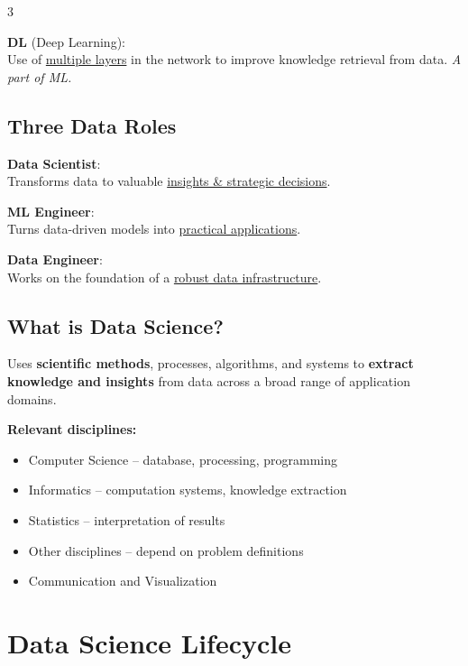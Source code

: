 \documentclass[a4paper,7pt]{extarticle}
\begin{document}
\begin{multicols}{3}
\begin{infobox}
\textbf{DL} (Deep Learning):\\
Use of \underline{multiple layers} in the network to improve knowledge retrieval from data. \textit{A part of ML.}
\end{infobox}

\subsection{Three Data Roles}

\begin{defbox}
\textbf{Data Scientist}:\\
Transforms data to valuable \underline{insights \& strategic decisions}.

\textbf{ML Engineer}:\\
Turns data-driven models into \underline{practical applications}.

\textbf{Data Engineer}:\\
Works on the foundation of a \underline{robust data infrastructure}.
\end{defbox}

\subsection{What is Data Science?}

\begin{infobox}
Uses \textbf{scientific methods}, processes, algorithms, and systems to \textbf{extract knowledge and insights} from data across a broad range of application domains.

\smallskip
\textbf{Relevant disciplines:}
\begin{itemize}
  \item Computer Science -- database, processing, programming
  \item Informatics -- computation systems, knowledge extraction
  \item Statistics -- interpretation of results
  \item Other disciplines -- depend on problem definitions
  \item Communication and Visualization
\end{itemize}
\end{infobox}

\section{Data Science Lifecycle}


\end{multicols}
\end{document}
